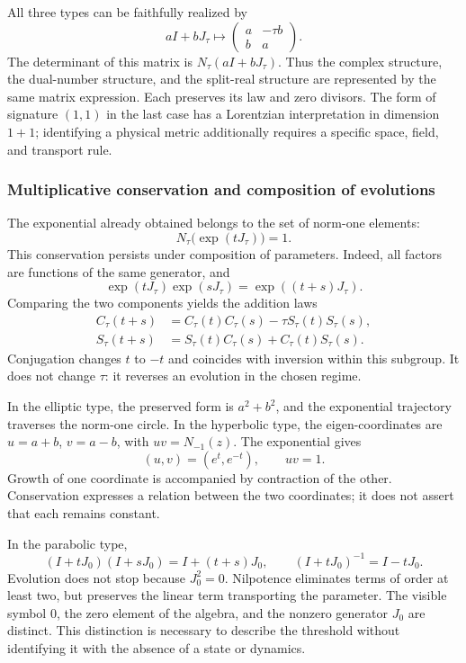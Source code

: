 All three types can be faithfully realized by
\[
 aI+bJ_\tau\longmapsto
 \begin{pmatrix}a&-\tau b\\b&a\end{pmatrix}.
\]
The determinant of this matrix is \(N_\tau(aI+bJ_\tau)\). Thus
the complex structure, the dual-number structure, and the split-real
structure are represented by the same matrix expression.
Each preserves its law and zero divisors. The form of signature
\((1,1)\) in the last case has a Lorentzian interpretation in dimension
\(1+1\); identifying a physical metric additionally requires a specific space,
field, and transport rule.

\subsubsection{Multiplicative conservation and composition of evolutions}
\label{trit-ampl-evoluciones}

The exponential already obtained belongs to the set of norm-one elements:
\[
 N_\tau\bigl(\exp(tJ_\tau)\bigr)=1.
\]
This conservation persists under composition of parameters. Indeed, all
factors are functions of the same generator, and
\[
 \exp(tJ_\tau)\exp(sJ_\tau)=\exp((t+s)J_\tau).
\]
Comparing the two components yields the addition laws
\begin{align}
 C_\tau(t+s)&=C_\tau(t)C_\tau(s)-\tau S_\tau(t)S_\tau(s),\\
 S_\tau(t+s)&=S_\tau(t)C_\tau(s)+C_\tau(t)S_\tau(s).
\end{align}
Conjugation changes \(t\) to \(-t\) and coincides with inversion within
this subgroup. It does not change \(\tau\): it reverses an evolution in the chosen
regime.

In the elliptic type, the preserved form is \(a^2+b^2\), and the exponential
trajectory traverses the norm-one circle. In the hyperbolic type, the
eigen-coordinates are \(u=a+b\), \(v=a-b\), with \(uv=N_{-1}(z)\).
The exponential gives
\[
 (u,v)=(e^t,e^{-t}),\qquad uv=1.
\]
Growth of one coordinate is accompanied by contraction of the other.
Conservation expresses a relation between the two coordinates; it does not assert
that each remains constant.

In the parabolic type,
\[
 (I+tJ_0)(I+sJ_0)=I+(t+s)J_0,\qquad
 (I+tJ_0)^{-1}=I-tJ_0.
\]
Evolution does not stop because \(J_0^2=0\). Nilpotence eliminates
terms of order at least two, but preserves the linear term
transporting the parameter. The visible symbol \(0\), the
zero element of the algebra, and the nonzero generator \(J_0\) are distinct. This distinction
is necessary to describe the threshold without identifying it with the absence of
a state or dynamics.

